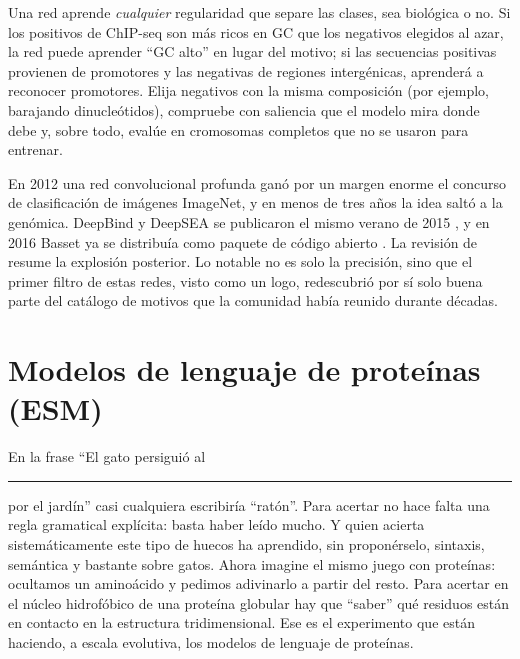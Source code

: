 \begin{cuidado}
Una red aprende \emph{cualquier} regularidad que separe las clases, sea biológica o no. Si los positivos de ChIP-seq son más ricos en GC que los negativos elegidos al azar, la red puede aprender ``GC alto'' en lugar del motivo; si las secuencias positivas provienen de promotores y las negativas de regiones intergénicas, aprenderá a reconocer promotores. Elija negativos con la misma composición (por ejemplo, barajando dinucleótidos), compruebe con saliencia que el modelo mira donde debe y, sobre todo, evalúe en cromosomas completos que no se usaron para entrenar.
\end{cuidado}

\begin{historia}
En 2012 una red convolucional profunda ganó por un margen enorme el concurso de clasificación de imágenes ImageNet, y en menos de tres años la idea saltó a la genómica. DeepBind y DeepSEA se publicaron el mismo verano de 2015 \parencite{c17-alipanahi2015,c17-zhou2015}, y en 2016 Basset ya se distribuía como paquete de código abierto \parencite{c17-kelley2016}. La revisión de \textcite{c17-eraslan2019} resume la explosión posterior. Lo notable no es solo la precisión, sino que el primer filtro de estas redes, visto como un logo, redescubrió por sí solo buena parte del catálogo de motivos que la comunidad había reunido durante décadas.
\end{historia}

\section{Modelos de lenguaje de proteínas (ESM)}\label{sec:17-plm}

\begin{intuicion}
En la frase ``El gato persiguió al \rule{1.2cm}{0.4pt} por el jardín'' casi cualquiera escribiría ``ratón''. Para acertar no hace falta una regla gramatical explícita: basta haber leído mucho. Y quien acierta sistemáticamente este tipo de huecos ha aprendido, sin proponérselo, sintaxis, semántica y bastante sobre gatos. Ahora imagine el mismo juego con proteínas: ocultamos un aminoácido y pedimos adivinarlo a partir del resto. Para acertar en el núcleo hidrofóbico de una proteína globular hay que ``saber'' qué residuos están en contacto en la estructura tridimensional. Ese es el experimento que están haciendo, a escala evolutiva, los modelos de lenguaje de proteínas.
\end{intuicion}

